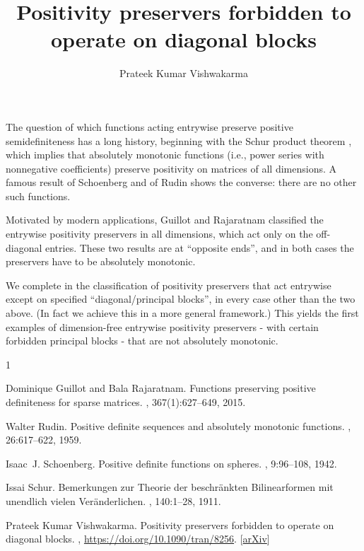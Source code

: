 \documentclass[a4paper]{amsart}
\date{}
\begin{document}
\title{Positivity preservers forbidden to operate on diagonal blocks}
\author{Prateek Kumar Vishwakarma} %
\address{University of Regina, Canada} %

\maketitle

The question of which functions acting entrywise preserve positive semidefiniteness has a long history, beginning with the Schur product theorem \cite{Schur}, which implies that absolutely monotonic functions (i.e., power series with nonnegative coefficients) preserve positivity on matrices of all dimensions. A famous result of Schoenberg and of Rudin \cite{Schoenberg, Rudin} shows the converse: there are no other such functions.

Motivated by modern applications, Guillot and Rajaratnam \cite{Guillot-Rajaratnam-Trans} classified the entrywise positivity preservers in all dimensions, which act only on the off-diagonal entries. These two results are at ``opposite ends'', and in both cases the preservers have to be absolutely monotonic.

We complete in \cite{V} the classification of positivity preservers that act entrywise except on specified ``diagonal/principal blocks'', in every case other than the two above. (In fact we achieve this in a more general framework.) This yields the first examples of dimension-free entrywise positivity preservers - with certain forbidden principal blocks - that are not absolutely monotonic.

\begin{thebibliography}{1}

Dominique Guillot and Bala Rajaratnam.
\newblock Functions preserving positive definiteness for sparse matrices.
, 367(1):627--649, 2015.

Walter Rudin.
\newblock Positive definite sequences and absolutely monotonic functions.
, 26:617--622, 1959.

Isaac~J. Schoenberg.
\newblock Positive definite functions on spheres.
, 9:96--108, 1942.

Issai Schur.
\newblock Bemerkungen zur {T}heorie der beschr\"{a}nkten {B}ilinearformen mit
  unendlich vielen {V}er\"{a}nderlichen.
, 140:1--28, 1911.

Prateek Kumar Vishwakarma.
\newblock Positivity preservers forbidden to operate on diagonal blocks.
, \href{https://doi.org/10.1090/tran/8256}{https://doi.org/10.1090/tran/8256}. [\href{https://arxiv.org/abs/2002.00332v4}{arXiv}]

\end{thebibliography}
\end{document}
